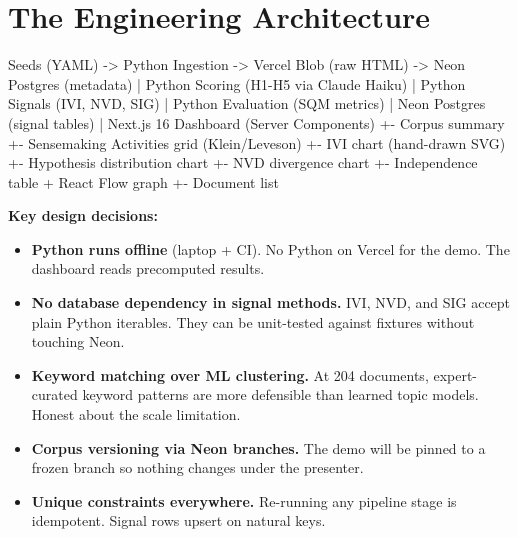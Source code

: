 \documentclass[11pt, letterpaper]{article}
\begin{document}
\section{The Engineering Architecture}

\begin{code}
Seeds (YAML) -> Python Ingestion -> Vercel Blob (raw HTML)
                                 -> Neon Postgres (metadata)
                                       |
                  Python Scoring (H1-H5 via Claude Haiku)
                                       |
                  Python Signals (IVI, NVD, SIG)
                                       |
                  Python Evaluation (SQM metrics)
                                       |
                  Neon Postgres (signal tables)
                                       |
                  Next.js 16 Dashboard (Server Components)
                     +- Corpus summary
                     +- Sensemaking Activities grid (Klein/Leveson)
                     +- IVI chart (hand-drawn SVG)
                     +- Hypothesis distribution chart
                     +- NVD divergence chart
                     +- Independence table + React Flow graph
                     +- Document list
\end{code}

\textbf{Key design decisions:}

\begin{itemize}
  \item \textbf{Python runs offline} (laptop + CI). No Python on Vercel for the demo. The dashboard reads precomputed results.
  \item \textbf{No database dependency in signal methods.} IVI, NVD, and SIG accept plain Python iterables. They can be unit-tested against fixtures without touching Neon.
  \item \textbf{Keyword matching over ML clustering.} At 204 documents, expert-curated keyword patterns are more defensible than learned topic models. Honest about the scale limitation.
  \item \textbf{Corpus versioning via Neon branches.} The demo will be pinned to a frozen branch so nothing changes under the presenter.
  \item \textbf{Unique constraints everywhere.} Re-running any pipeline stage is idempotent. Signal rows upsert on natural keys.
\end{itemize}


\end{document}
